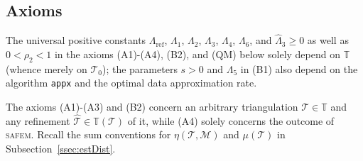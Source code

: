 \documentclass{siamltex1213}
\begin{document}
\subsection{Axioms}
The universal positive constants ${\ensuremath{\Lambda_{\mathrm{ref}}}}$, ${\ensuremath{\Lambda_{\mathrm{1}}}}$, ${\ensuremath{\Lambda_{\mathrm{2}}}}$, ${\ensuremath{\Lambda_{\mathrm{3}}}}$,  ${\ensuremath{\Lambda_{\mathrm{4}}}}$, ${\ensuremath{\Lambda_{\mathrm{6}}}}$, and 
 ${\ensuremath{\widehat{\Lambda}_{\mathrm{3}}}}\geq 0$ as well as  $0<\rho_2<1$ in the axioms (A1)-(A4), (B2), and (QM) 
below solely depend on ${\mathbb T}$ (whence merely on ${\mathcal T_{0}}$); the parameters 
 $s>0$  and  ${\ensuremath{\Lambda_{\mathrm{5}}}}$ in (B1)  also depend on the algorithm \texttt{appx} and the optimal data 
 approximation rate.
 
The axioms 
(A1)-(A3) and (B2) concern an arbitrary triangulation $ {\mathcal{T}} \in {\mathbb T}$ and any refinement 
${\hat{\mathcal{T}}} \in {\mathbb T\left({\mathcal{T}}\right)}$ of it, while (A4) solely concerns the outcome of {\textsc{safem}\xspace}. Recall the sum conventions for $\eta({\mathcal{T}}, {\mathcal{M}})$ and $\mu({\mathcal{T}})$ in Subsection~\ref{ssec:estDist}.
\end{document}
